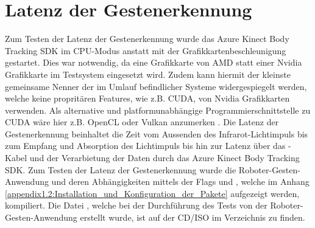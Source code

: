 












\section{Latenz der Gestenerkennung}
Zum Testen der Latenz der Gestenerkennung wurde das Azure Kinect Body Tracking SDK im CPU-Modus anstatt mit der Grafikkartenbeschleunigung gestartet. Dies war notwendig, da eine Grafikkarte von AMD statt einer Nvidia Grafikkarte im Testsystem eingesetzt wird. Zudem kann hiermit der kleinste gemeinsame Nenner der im Umlauf befindlicher Systeme widergespiegelt werden, welche keine propritären Features, wie z.B. CUDA, von Nvidia Grafikkarten verwenden. Als alternative und platformunabhängige Programmierschnittstelle zu CUDA wäre hier z.B. OpenCL oder Vulkan anzumerken \cite{vulkan_api_2020}. Die Latenz der Gestenerkennung beinhaltet die Zeit vom Aussenden des Infrarot-Lichtimpuls bis zum Empfang und Absorption des Lichtimpuls bis hin zur Latenz über das -Kabel und der Verarbietung der Daten durch das Azure Kinect Body Tracking SDK. Zum Testen der Latenz der Gestenerkennung wurde die Roboter-Gesten-Anwendung und deren Abhängigkeiten mittels der Flags  und , welche im Anhang \ref{appendix1.2:Installation_und_Konfiguration_der_Pakete} aufgezeigt werden, kompiliert. Die Datei , welche bei der Durchführung des Tests von der Roboter-Gesten-Anwendung erstellt wurde, ist auf der CD/ISO im Verzeichnis  zu finden.

